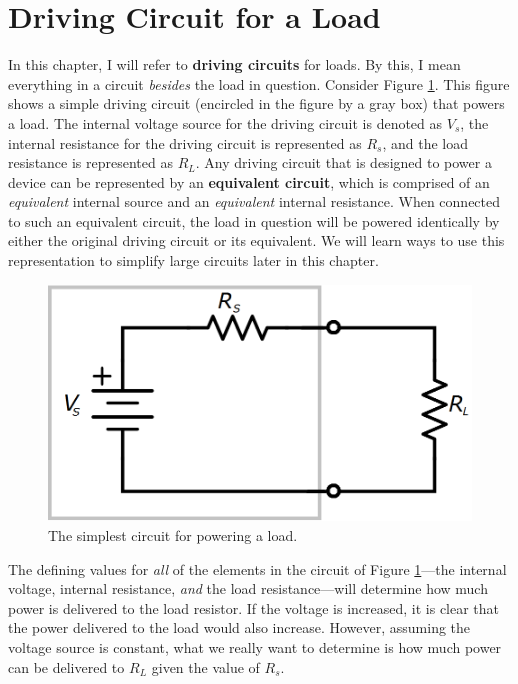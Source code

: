 \section{Driving Circuit for a Load}
In this chapter, I will refer to \textbf{driving circuits} for loads. By this, I mean everything in a circuit \textit{besides} the load in question. Consider Figure \ref{maxPowerLoadMatching}. This figure shows a simple driving circuit (encircled in the figure by a gray box) that powers a load. The internal voltage source for the driving circuit is denoted as $V_s$, the internal resistance for the driving circuit is represented as $R_s$, and the load resistance is represented as $R_L$. Any driving circuit that is designed to power a device can be represented by an \textbf{equivalent circuit}, which is comprised of an \textit{equivalent} internal source and an \textit{equivalent} internal resistance. When connected to such an equivalent circuit, the load in question will be powered identically by either the original driving circuit or its equivalent. We will learn ways to use this representation to simplify large circuits later in this chapter.
\begin{figure}[h!]
\centering
\includegraphics[width=13cm]{figures/maxPLoadMatching.png}
\caption{The simplest circuit for powering a load.}
\label{maxPowerLoadMatching}
\end{figure}
\par
The defining values for \textit{all} of the elements in the circuit of Figure \ref{maxPowerLoadMatching}---the internal voltage, internal resistance, \textit{and} the load resistance---will determine how much power is delivered to the load resistor. If the voltage is increased, it is clear that the power delivered to the load would also increase. However, assuming the voltage source is constant, what we really want to determine is how much power can be delivered to $R_L$ given the value of $R_s$.
